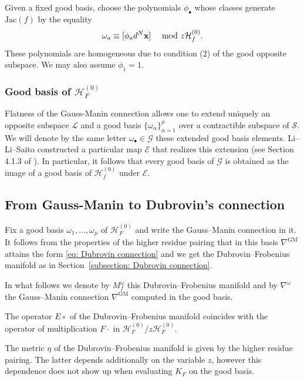 \documentclass[12pt,a4paper]{amsart}
\newcommand{\E}[2]{{E_{#1}^{#2}}}
\newcommand{\Jac}{\mathrm{Jac}}
\newcommand{\bx}{{\bf x}}
\def\E{{\mathcal E}}
\def\G{{\mathcal G}}
\def\H{{\mathcal H}}
\def\L{{\mathcal L}}
\renewcommand{\S}{{\mathcal S}}
\newcommand{\<}{\left<}
\renewcommand{\>}{\right>}
\newcommand{\GM}{{\mathrm{GM}}}
\numberwithin{equation}{section}
\begin{document}
Given a fixed good basis, choose the polynomials $\phi_\bullet$ whose classes generate $\Jac(f)$ by the equality
\begin{equation}\label{eq: omega_bullet to phi_bullet}
    \omega_a \equiv [ \phi_a d^N \bx] \quad \text{ mod } z \H_f^{(0)}.
\end{equation}
These polynomials are homogeneous due to condition (2) of the good opposite subspace. We may also assume $\phi_1 = 1$.

\subsubsection{Good basis of $\H_F^{(0)}$}

Flatness of the Gauss-Manin connection allows one to extend uniquely an opposite subspace $\L$ and a good basis $\lbrace \omega_\alpha \rbrace_{\alpha=1}^\mu$ over a contractible subspace of $\S$.
We will denote by the same letter $\omega_\bullet \in \G$ these extended good basis elements. Li--Li--Saito constructed a particular map $\E$ that realizes this extension (see Section 4.1.3 of \cite{LLS}). In particular, it follows that every good basis of $\G$ is obtained as the image of a good basis of $\H_f^{(0)}$ under $\E$.

\subsection{From Gauss-Manin to Dubrovin's connection}\label{subsection: DC from GM}
Fix a good basis $\omega_1,\dots,\omega_\mu$ of $\H_F^{(0)}$ and write the Gauss--Manin connection in it. It follows from the properties of the higher residue pairing that in this basis $\nabla^\GM$ attains the form \eqref{eq: Dubrovin connection} and we get the Dubrovin--Frobenius manifold as in Section~\ref{subsection: Dubrovin connection}.

In what follows we denote by $M^\omega_f$ this Dubrovin--Frobenius manifold and by $\nabla^{\omega}$ the Gauss--Manin connection $\nabla^\GM$ computed in the good basis.

The operator $E \circ$ of the Dubrovin--Frobenius manifold coincides with the operator of multiplication $F \cdot $ in $\H_F^{(0)} / z \H_F^{(0)}$.

The metric $\eta$ of the Dubrovin--Frobenius manifold is given by the higher residue pairing. The latter depends additionally on the variable $z$, however this dependence does not show up when evaluating $K_F$ on the good basis.
\end{document}
